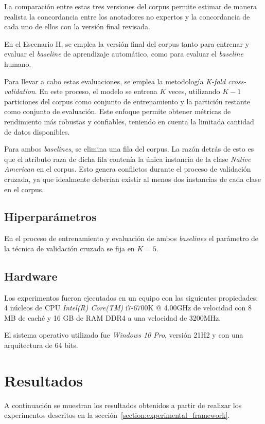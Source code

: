 La comparaci\'on entre estas tres versiones del corpus permite estimar de manera realista la concordancia entre los anotadores 
no expertos y la concordancia de cada uno de ellos con la versi\'on final revisada. 

En el Escenario II, se emplea la versi\'on final del corpus tanto para entrenar y evaluar el \emph{baseline} de aprendizaje 
autom\'atico, como para evaluar el \emph{baseline} humano.

Para llevar a cabo estas evaluaciones, se emplea la 
metodolog\'ia \emph{K-fold cross-validation}. En este proceso, el modelo se entrena $K$ veces, utilizando 
$K-1$ particiones del corpus como conjunto de entrenamiento y la partici\'on restante como conjunto de evaluaci\'on.
Este enfoque permite obtener m\'etricas de rendimiento m\'as robustas y confiables, teniendo en cuenta 
la limitada cantidad de datos disponibles.

Para ambos \emph{baselines}, se elimina una fila del corpus. La raz\'on detr\'as de esto es que el atributo raza de dicha 
fila conten\'ia la \'unica instancia de la clase \emph{Native American} en el corpus. 
Esto genera conflictos durante el proceso de validaci\'on cruzada, ya que idealmente deber\'ian existir al menos dos 
instancias de cada clase en el corpus.

\subsection{Hiperpar\'ametros}
En el proceso de entrenamiento y evaluaci\'on de ambos \emph{baselines} el par\'ametro de la t\'ecnica de validaci\'on
cruzada se fija en $K=5$. 

\subsection{Hardware}
Los experimentos fueron ejecutados en un equipo con las siguientes propiedades: 4 n\'ucleos de CPU \emph{Intel(R) Core(TM)} i7-6700K
@ 4.00GHz de velocidad con 8 MB de cach\'e y 16 GB de RAM DDR4 a una velocidad de 3200MHz.

El sistema operativo utilizado fue \emph{Windows 10 Pro}, versi\'on 21H2 y con una arquitectura de 64 bits.

\section{Resultados}\label{section:results}
A continuaci\'on se muestran los resultados obtenidos a partir de realizar los experimentos descritos en la 
secci\'on~\ref{section:experimental_framework}.

